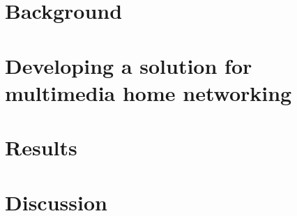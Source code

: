 \documentclass[english,12pt,a4paper,pdftex]{article}
\begin{document}
 

\clearpage

 \section{Background}
 


\clearpage

\section{Developing a solution for multimedia home networking}



\clearpage

\section{Results}



\clearpage

\section{Discussion}



\clearpage



\cite{stateofHN}
\cite{AirPlay-spec}
\cite{next_generation}
\cite{DLNA_proxy2}
\cite{upnp}
\cite{standards-perspective}
\cite{DLNA_proxy}
\cite{end_user}
\cite{ipv6}



 

%
\end{document}
